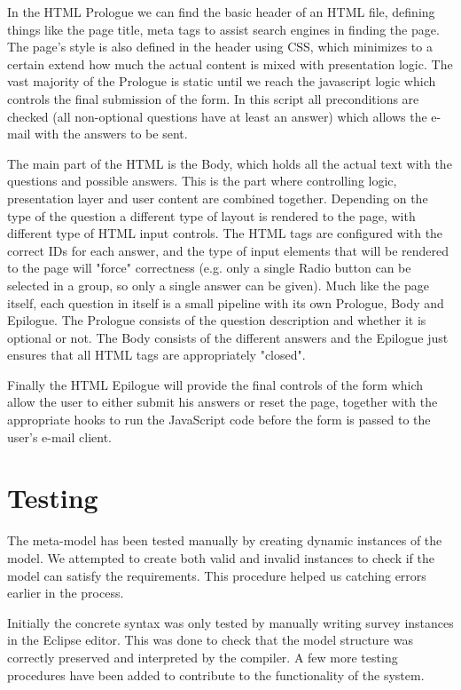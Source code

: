 \documentclass[runningheads]{llncs}
\begin{document}
In the HTML Prologue we can find the basic header of an HTML file, defining things like the page title, meta tags to assist search engines in finding the page. The page's style is also defined in the header using CSS, which minimizes to a certain extend how much the actual content is mixed with presentation logic. The vast majority of the Prologue is static until we reach the javascript logic which controls the final submission of the form. In this script all preconditions are checked (all non-optional questions have at least an answer) which allows the e-mail with the answers to be sent. 

The main part of the HTML is the Body, which holds all the actual text with the questions and possible answers. This is the part where controlling logic, presentation layer and user content are combined together. Depending on the type of the question a different type of layout is rendered to the page, with different type of HTML input controls. The HTML tags are configured with the correct IDs for each answer, and the type of input elements that will be rendered to the page will "force" correctness (e.g. only a single Radio button can be selected in a group, so only a single answer can be given). Much like the page itself, each question in itself is a small pipeline with its own Prologue, Body and Epilogue. The Prologue consists of the question description and whether it is optional or not. The Body consists of the different answers and the Epilogue just ensures that all HTML tags are appropriately "closed".  

Finally the HTML  Epilogue will provide the final controls of the form which allow the user to either submit his answers or reset the page, together with the appropriate hooks to run the JavaScript code before the form is passed to the user's e-mail client.

\section{Testing}
The meta-model has been tested manually by creating dynamic instances of the model. We attempted to create both valid and invalid instances to check if the model can satisfy the requirements. This procedure helped us catching errors earlier in the process.

Initially the concrete syntax was only tested by manually writing survey instances in the Eclipse editor. This was done to check that the model structure was correctly preserved and interpreted by the compiler. A few more testing procedures have been added to contribute to the functionality of the system.
\end{document}

